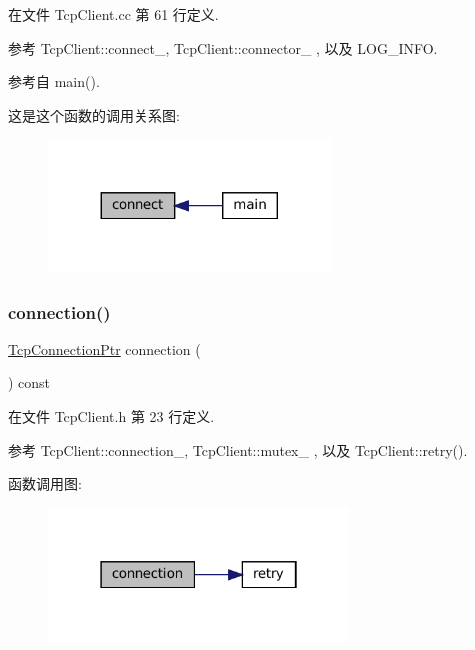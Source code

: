 在文件 Tcp\+Client.\+cc 第 61 行定义.



参考 Tcp\+Client\+::connect\+\_\+, Tcp\+Client\+::connector\+\_\+ , 以及 L\+O\+G\+\_\+\+I\+N\+FO.



参考自 main().

这是这个函数的调用关系图\+:
\nopagebreak
\begin{figure}[H]
\begin{center}
\leavevmode
\includegraphics[width=212pt]{classmuduo_1_1TcpClient_a1396bf9b5defe9fa844a63b5cd40ac0e_icgraph}
\end{center}
\end{figure}
\mbox{\label{classmuduo_1_1TcpClient_aad3fe0470c6ae2b643bb3b834742e8f4}} 
\subsubsection{\texorpdfstring{connection()}{connection()}}
{\footnotesize\ttfamily \hyperlink{namespacemuduo_a40c45128e9700d337d92f3cbb8dd4a0a}{Tcp\+Connection\+Ptr} connection (\begin{DoxyParamCaption}{ }\end{DoxyParamCaption}) const\hspace{0.3cm}{\ttfamily [inline]}}



在文件 Tcp\+Client.\+h 第 23 行定义.



参考 Tcp\+Client\+::connection\+\_\+, Tcp\+Client\+::mutex\+\_\+ , 以及 Tcp\+Client\+::retry().

函数调用图\+:
\nopagebreak
\begin{figure}[H]
\begin{center}
\leavevmode
\includegraphics[width=226pt]{classmuduo_1_1TcpClient_aad3fe0470c6ae2b643bb3b834742e8f4_cgraph}
\end{center}
\end{figure}
\mbox{\label{classmuduo_1_1TcpClient_a960705de531a20389fb29928d43258c3}} 
